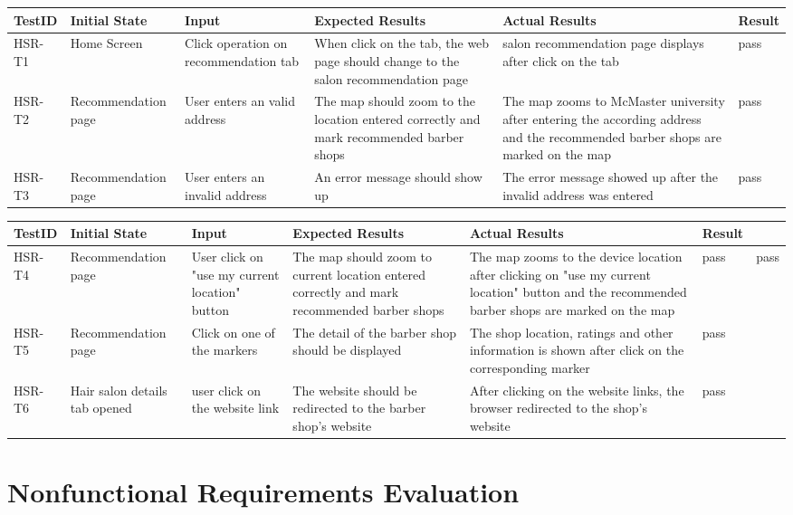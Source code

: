 \documentclass[12pt, titlepage]{article}
\begin{document}
\begin{tabular}{ |p{2cm}| p{3cm}| p{3cm}| p{3cm}|p{2cm}| p{1cm}|} 
 \hline
 TestID & Initial State & Input & Expected Results & Actual Results & Result \\ 
\hline
HSR-T1 & Home Screen & Click operation on recommendation tab & When click on the tab, the web page should change to the salon recommendation page & salon recommendation page displays after click on the tab & pass\\
 \hline
HSR-T2 & Recommendation page & User enters an valid address & The map should zoom to the location entered correctly and mark recommended barber shops & The map zooms to McMaster university after entering the according address and the recommended barber shops are marked on the map & pass\\
 \hline
 HSR-T3 & Recommendation page & User enters an invalid address & An error message should show up & The error message showed up after the invalid address was entered & pass\\
 \hline
\end{tabular}

\begin{tabular}{ |p{2cm}| p{3cm}| p{3cm}| p{3cm}|p{2cm}| p{1cm}|} 
 \hline
 TestID & Initial State & Input & Expected Results & Actual Results & Result \\ 
\hline
HSR-T4 & Recommendation page & User click on "use my current location" button & The map should zoom to current location entered correctly and mark recommended barber shops & The map zooms to the device location after clicking on "use my current location" button and the recommended barber shops are marked on the map & pass & pass\\
 \hline
HSR-T5 & Recommendation page & Click on one of the markers & The detail of the barber shop should be displayed & The shop location, ratings and other information is shown after click on the corresponding marker & pass\\
 \hline
 HSR-T6 & Hair salon details tab opened & user click on the website link & The website should be redirected to the barber shop's website & After clicking on the website links, the browser redirected to the shop's website & pass\\
 \hline
\end{tabular}

\section{Nonfunctional Requirements Evaluation}
\end{document}
